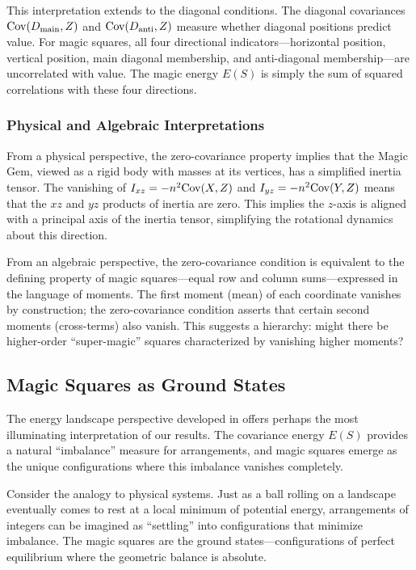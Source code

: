 This interpretation extends to the diagonal conditions. 
The diagonal covariances $\mathrm{Cov}(D_{\mathrm{main}}, Z)$ and $\mathrm{Cov}(D_{\mathrm{anti}}, Z)$ 
measure whether diagonal positions predict value.
For magic squares, all four directional indicators---horizontal position, vertical position, 
main diagonal membership, and anti-diagonal membership---are uncorrelated with value.
The magic energy $E(S)$ is simply the sum of squared correlations with these four directions.

\subsubsection{Physical and Algebraic Interpretations}

From a physical perspective, the zero-covariance property implies that the Magic Gem, 
viewed as a rigid body with masses at its vertices, has a simplified inertia tensor.
The vanishing of $I_{xz} = -n^2 \mathrm{Cov}(X,Z)$ and $I_{yz} = -n^2 \mathrm{Cov}(Y,Z)$ means that 
the $xz$ and $yz$ products of inertia are zero.
This implies the $z$-axis is aligned with a principal axis of the inertia tensor,
simplifying the rotational dynamics about this direction.

From an algebraic perspective, the zero-covariance condition is equivalent to the defining property 
of magic squares---equal row and column sums---expressed in the language of moments.
The first moment (mean) of each coordinate vanishes by construction;
the zero-covariance condition asserts that certain second moments (cross-terms) also vanish.
This suggests a hierarchy: might there be higher-order ``super-magic'' squares 
characterized by vanishing higher moments?

\subsection{Magic Squares as Ground States}

The energy landscape perspective developed in  offers perhaps 
the most illuminating interpretation of our results.
The covariance energy $E(S)$ provides a natural ``imbalance'' measure for arrangements,
and magic squares emerge as the unique configurations where this imbalance vanishes completely.

Consider the analogy to physical systems.
Just as a ball rolling on a landscape eventually comes to rest at a local minimum of potential energy,
arrangements of integers can be imagined as ``settling'' into configurations that minimize imbalance.
The magic squares are the ground states---configurations of perfect equilibrium 
where the geometric balance is absolute.

